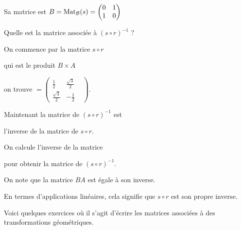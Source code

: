 \change
Sa matrice est $B = \mathop{\mathrm{Mat}}\nolimits_{\mathcal{B}} (s) = \begin{pmatrix} 0&1\\1&0 \end{pmatrix}$

Quelle est la matrice associée à $(s \circ r)^{-1}$ ?


\change
On commence par la matrice $s \circ r$ 

\change
qui est le produit $B \times A$

\change
on trouve 
$= \begin{pmatrix}
\frac12&\frac{\sqrt{3}}{2} & \\
\frac{\sqrt{3}}{2}&-\frac12& 
\end{pmatrix}$.

\change
Maintenant la matrice de $(s \circ r)^{-1}$ est 

\change
l'inverse de la matrice de $s \circ r$.

\change
On calcule l'inverse de la matrice

\change
pour obtenir la matrice de $(s \circ r)^{-1}$.

On note que la matrice $BA$ est égale à son inverse.

En termes d'applications linéaires, cela signifie que $s\circ r$ est son propre inverse.
  
\diapo

Voici quelques exercices où il s'agit d'écrire les matrices associées à des transformations géométriques.




